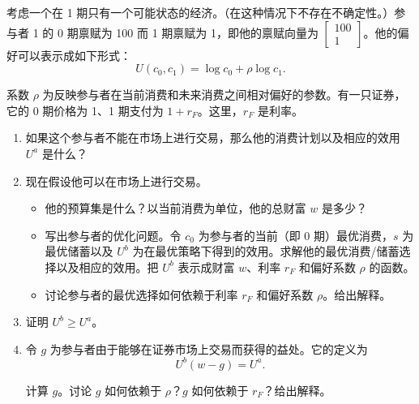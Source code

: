 \begin{problem}
 考虑一个在 1 期只有一个可能状态的经济。（在这种情况下不存在不确定性。）参与者 1 的 0 期禀赋为 100 而 1 期禀赋为 1，即他的禀赋向量为 $\begin{bmatrix}100 \\ 1\end{bmatrix}$。他的偏好可以表示成如下形式：
\[
    U(c_{0},c_{1})=\log c_{0}+\rho\log c_{1}.
\]

系数 $\rho$ 为反映参与者在当前消费和未来消费之间相对偏好的参数。有一只证券，它的 0 期价格为 1、1 期支付为 $1+r_{F}$。这里，$r_{F}$ 是利率。
\begin{enumerate}[label=(\alph*)]
    \item 如果这个参与者不能在市场上进行交易，那么他的消费计划以及相应的效用 $U^{a}$ 是什么？
    \item 现在假设他可以在市场上进行交易。
    \begin{itemize}
        \item 他的预算集是什么？以当前消费为单位，他的总财富 $w$ 是多少？
        \item 写出参与者的优化问题。令 $c_{0}$ 为参与者的当前（即 0 期）最优消费，$s$ 为最优储蓄以及 $U^{b}$ 为在最优策略下得到的效用。求解他的最优消费/储蓄选择以及相应的效用。把 $U^{b}$ 表示成财富 $w$、利率 $r_{F}$ 和偏好系数 $\rho$ 的函数。
        \item 讨论参与者的最优选择如何依赖于利率 $r_{F}$ 和偏好系数 $\rho$。给出解释。
    \end{itemize}
    \item 证明 $U^{b}\ge U^{a}$。
    \item 令 $g$ 为参与者由于能够在证券市场上交易而获得的益处。它的定义为
    \[
        U^{b}(w-g)=U^{a}.
    \]

    计算 $g$。讨论 $g$ 如何依赖于 $\rho$？$g$ 如何依赖于 $r_{F}$？给出解释。
\end{enumerate}
\end{problem}
